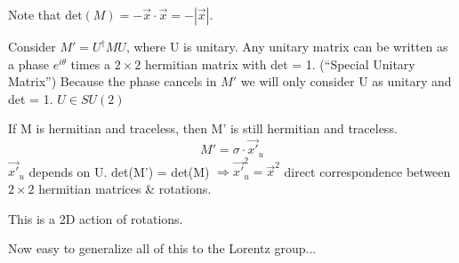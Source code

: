 {Note that $\textrm{det}(M) = - \vec{x}\cdot\vec{x} = - |\vec{x}|$.

Consider $M'=U^{\dagger}MU$, where U is unitary.
Any unitary matrix can be written as a phase $e^{i\theta}$ times a $2\times2$ hermitian matrix with det = 1.  (``Special Unitary Matrix'')
Because the phase cancels in $M'$ we will only consider U as unitary and det = 1. 
$U \in SU(2)$

If M is hermitian and traceless, then M' is still hermitian and traceless.
\begin{equation*}
M' = \sigma \cdot \vec{x'}_u
\end{equation*}
$\vec{x'}_{u} $ depends on U.  det(M') = det(M) $\Rightarrow \vec{x'}_u^2 = {\vec{x}}^2 $%
direct correspondence between $2\times2$ hermitian matrices \& rotations.

This is a 2D action of rotations.

Now easy to generalize all of this to the Lorentz group...

}



